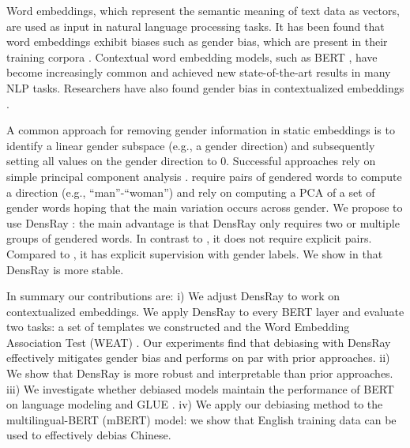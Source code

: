 Word embeddings, which represent the semantic meaning of
text data as vectors, are used as input in natural language
processing tasks. It has been found that word embeddings
exhibit biases such as gender bias, which
are present in their training
corpora . Contextual word
embedding models, such as BERT , have
become increasingly common and achieved new state-of-the-art
results in many NLP tasks. Researchers have also found
gender bias in contextualized
embeddings .

A common approach for removing gender information in static
embeddings is to identify a linear gender subspace (e.g., a
gender direction) and subsequently setting all values on the
gender direction to 0. Successful approaches rely on simple
principal component
analysis \cite{bolukbasi2016man,mu2018all}. \cite{bolukbasi2016man}
require pairs of gendered words to compute a direction
(e.g., ``man''-``woman'') and \cite{mu2018all} rely on
computing a PCA of a set of gender words hoping that the
main variation occurs across gender. We propose to use
DensRay : the main advantage is
that DensRay only requires two or multiple groups of
gendered words. In contrast to \cite{bolukbasi2016man}, it
does not require explicit pairs. Compared
to \cite{mu2018all}, it has explicit supervision with gender
labels. We show in  that
DensRay is more stable.

In summary our contributions are: i) We adjust DensRay to
 work on contextualized embeddings.  We apply DensRay to
 every BERT layer and evaluate two tasks: a set of templates
 we constructed and the Word Embedding Association Test
 (WEAT) . Our experiments find
 that debiasing with DensRay effectively mitigates gender
 bias and performs on par with prior approaches. ii) We
 show that DensRay is more robust and interpretable than
 prior approaches.  iii) We investigate whether debiased
 models maintain the performance of BERT on language
 modeling and  GLUE  . iv) We
 apply our debiasing method to the multilingual-BERT (mBERT)
 model: we show that English training data can be used to
 effectively debias Chinese.

